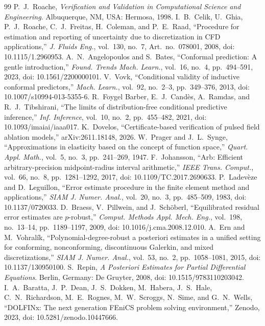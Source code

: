 \documentclass[11pt]{article}
\begin{document}
\begin{thebibliography}{99}
 P.~J.~Roache, \emph{Verification and Validation in Computational Science and Engineering}. Albuquerque, NM, USA: Hermosa, 1998.
 I.~B.~Celik, U.~Ghia, P.~J.~Roache, C.~J.~Freitas, H.~Coleman, and P.~E.~Raad, ``Procedure for estimation and reporting of uncertainty due to discretization in CFD applications,'' \emph{J. Fluids Eng.}, vol.~130, no.~7, Art.~no.~078001, 2008, doi: 10.1115/1.2960953.
 A.~N.~Angelopoulos and S.~Bates, ``Conformal prediction: A gentle introduction,'' \emph{Found. Trends Mach. Learn.}, vol.~16, no.~4, pp.~494--591, 2023, doi: 10.1561/2200000101.
 V.~Vovk, ``Conditional validity of inductive conformal predictors,'' \emph{Mach. Learn.}, vol.~92, no.~2--3, pp.~349--376, 2013, doi: 10.1007/s10994-013-5355-6.
 R.~Foygel Barber, E.~J.~Cand\`es, A.~Ramdas, and R.~J.~Tibshirani, ``The limits of distribution-free conditional predictive inference,'' \emph{Inf. Inference}, vol.~10, no.~2, pp.~455--482, 2021, doi: 10.1093/imaiai/iaaa017.
 K.~Dovelos, ``Certificate-based verification of pulsed field ablation models,'' arXiv:2611.18148, 2026.
 W.~Prager and J.~L.~Synge, ``Approximations in elasticity based on the concept of function space,'' \emph{Quart. Appl. Math.}, vol.~5, no.~3, pp.~241--269, 1947.
 F.~Johansson, ``Arb: Efficient arbitrary-precision midpoint-radius interval arithmetic,'' \emph{IEEE Trans. Comput.}, vol.~66, no.~8, pp.~1281--1292, 2017, doi: 10.1109/TC.2017.2690633.
 P.~Ladev\`eze and D.~Leguillon, ``Error estimate procedure in the finite element method and applications,'' \emph{SIAM J. Numer. Anal.}, vol.~20, no.~3, pp.~485--509, 1983, doi: 10.1137/0720033.
 D.~Braess, V.~Pillwein, and J.~Sch\"oberl, ``Equilibrated residual error estimates are $p$-robust,'' \emph{Comput. Methods Appl. Mech. Eng.}, vol.~198, no.~13--14, pp.~1189--1197, 2009, doi: 10.1016/j.cma.2008.12.010.
 A.~Ern and M.~Vohral\'ik, ``Polynomial-degree-robust a posteriori estimates in a unified setting for conforming, nonconforming, discontinuous Galerkin, and mixed discretizations,'' \emph{SIAM J. Numer. Anal.}, vol.~53, no.~2, pp.~1058--1081, 2015, doi: 10.1137/130950100.
 S.~Repin, \emph{A Posteriori Estimates for Partial Differential Equations}. Berlin, Germany: De Gruyter, 2008, doi: 10.1515/9783110203042.
 I.~A.~Baratta, J.~P.~Dean, J.~S.~Dokken, M.~Habera, J.~S.~Hale, C.~N.~Richardson, M.~E.~Rognes, M.~W.~Scroggs, N.~Sime, and G.~N.~Wells, ``DOLFINx: The next generation FEniCS problem solving environment,'' Zenodo, 2023, doi: 10.5281/zenodo.10447666.

\end{thebibliography}
\end{document}
